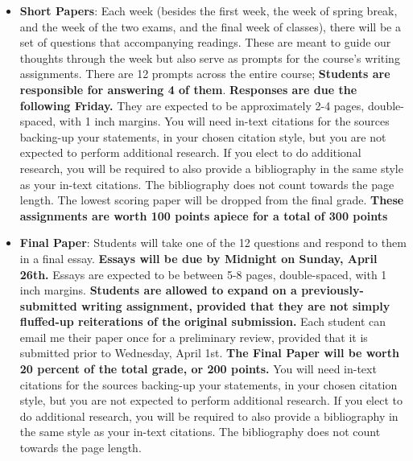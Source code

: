 \documentclass[11pt]{article}
\begin{document}
\begin{itemize}
	\item \textbf{Short Papers}: Each week (besides the first week, the week of spring break, and the week of the two exams, and the final week of classes), there will be a set of questions that accompanying readings. These are meant to guide our thoughts through the week but also serve as prompts for the course's writing assignments. There are 12 prompts across the entire course; \textbf{Students are responsible for answering 4 of them}. \textbf{Responses are due the following Friday.} They are expected to be approximately 2-4 pages, double-spaced, with 1 inch margins. You will need in-text citations for the sources backing-up your statements, in your chosen citation style, but you are not expected to perform additional research. If you elect to do additional research, you will be required to also provide a bibliography in the same style as your in-text citations. The bibliography does not count towards the page length. The lowest scoring paper will be dropped from the final grade. \textbf{These assignments are worth 100 points apiece for a total of 300 points}
	\item \textbf{Final Paper}: Students will take one of the 12 questions and respond to them in a final essay. \textbf{Essays will be due by Midnight on Sunday, April 26th.} Essays are expected to be between 5-8 pages, double-spaced, with 1 inch margins.\textbf{ Students are allowed to expand on a previously-submitted writing assignment, provided that they are not simply fluffed-up reiterations of the original submission.} Each student can email me their paper once for a preliminary review, provided that it is submitted prior to Wednesday, April 1st. \textbf{The Final Paper will be worth 20 percent of the total grade, or 200 points.} You will need in-text citations for the sources backing-up your statements, in your chosen citation style, but you are not expected to perform additional research. If you elect to do additional research, you will be required to also provide a bibliography in the same style as your in-text citations. The bibliography does not count towards the page length.
\end{itemize}
\end{document}
